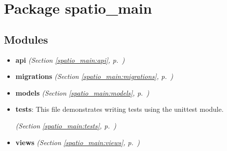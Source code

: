 %
%
%


\section{Package spatio\_main}

    \label{spatio_main}


\subsection{Modules}

\begin{itemize}
\setlength{\parskip}{0ex}
\item \textbf{api}
  \textit{(Section \ref{spatio_main:api}, p.~\pageref{spatio_main:api})}

\item \textbf{migrations}
  \textit{(Section \ref{spatio_main:migrations}, p.~\pageref{spatio_main:migrations})}

\item \textbf{models}
  \textit{(Section \ref{spatio_main:models}, p.~\pageref{spatio_main:models})}

\item \textbf{tests}: This file demonstrates writing tests using the unittest module.



  \textit{(Section \ref{spatio_main:tests}, p.~\pageref{spatio_main:tests})}

\item \textbf{views}
  \textit{(Section \ref{spatio_main:views}, p.~\pageref{spatio_main:views})}

\end{itemize}



